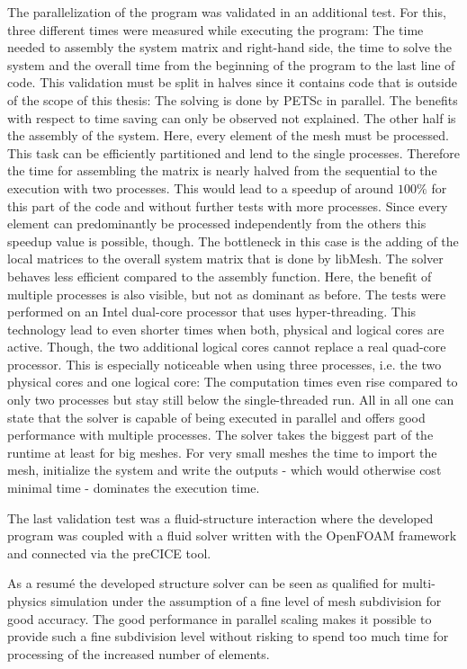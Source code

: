   The parallelization of the program was validated in an additional test. For this, three different times were measured while executing the program: The time needed to assembly the system matrix and right-hand side, the time to solve the system and the overall time from the beginning of the program to the last line of code. This validation must be split in halves since it contains code that is outside of the scope of this thesis: The solving is done by PETSc in parallel. The benefits with respect to time saving can only be observed not explained. The other half is the assembly of the system. Here, every element of the mesh must be processed. This task can be efficiently partitioned and lend to the single processes. Therefore the time for assembling the matrix is nearly halved from the sequential to the execution with two processes. This would lead to a speedup of around $100\%$ for this part of the code and without further tests with more processes. Since every element can predominantly be processed independently from the others this speedup value is possible, though. The bottleneck in this case is the adding of the local matrices to the overall system matrix that is done by libMesh. The solver behaves less efficient compared to the assembly function. Here, the benefit of multiple processes is also visible, but not as dominant as before. The tests were performed on an Intel dual-core processor that uses hyper-threading. This technology lead to even shorter times when both, physical and logical cores are active. Though, the two additional logical cores cannot replace a real quad-core processor. This is especially noticeable when using three processes, i.e. the two physical cores and one logical core: The computation times even rise compared to only two processes but stay still below the single-threaded run. All in all one can state that the solver is capable of being executed in parallel and offers good performance with multiple processes. The solver takes the biggest part of the runtime at least for big meshes. For very small meshes the time to import the mesh, initialize the system and write the outputs - which would otherwise cost minimal time - dominates the execution time.
  
  The last validation test was a fluid-structure interaction where the developed program was coupled with a fluid solver written with the OpenFOAM framework and connected via the preCICE tool.
 
  As a resum\'{e} the developed structure solver can be seen as qualified for multi-physics simulation under the assumption of a fine level of mesh subdivision for good accuracy. The good performance in parallel scaling makes it possible to provide such a fine subdivision level without risking to spend too much time for processing of the increased number of elements.

